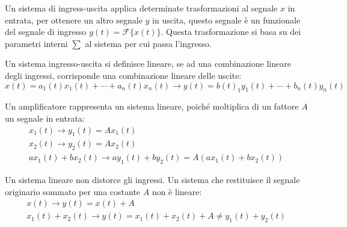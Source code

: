 \documentclass{article}
\numberwithin{equation}{subsection}
\begin{document}
Un sistema di ingress-uscita applica determinate trasformazioni al segnale $x$ in entrata, per ottenere un altro segnale $y$ in uscita, questo segnale è un funzionale 
del segnale di ingresso $y(t)=\mathscr{F}\{x(t)\}$. Questa trasformazione si basa su dei parametri interni $\sum$ al sistema per cui passa l'ingresso. 
\begin{center}
\end{center}

Un sistema ingresso-uscita si definisce lineare, se ad una combinazione lineare degli ingressi, corrisponde una combinazione lineare delle uscite:
\begin{equation*}
    x(t)=a_1(t)x_1(t)+\cdots+a_n(t)x_n(t)\to y(t)=b(t)_1y_1(t)+\cdots+b_n(t)y_n(t)
\end{equation*}

Un amplificatore rappresenta un sistema lineare, poiché moltiplica di un fattore $A$ un segnale in entrata:
\begin{gather*}
    x_1(t)\to y_1(t)=Ax_1(t)\\
    x_2(t)\to y_2(t)=Ax_2(t)\\
    ax_1(t)+bx_2(t)\to ay_1(t)+by_2(t)=A(ax_1(t)+bx_2(t))
\end{gather*} 
\begin{center}
\end{center}
Un sistema lineare non distorce gli ingressi. Un sistema che restituisce il segnale originario sommato per una costante $A$ non è lineare:
\begin{gather*}
    x(t)\to y(t)=x(t)+A\\
    x_1(t)+x_2(t)\to y(t)=x_1(t)+x_2(t)+A\neq y_1(t)+y_2(t)
\end{gather*}
\end{document}
